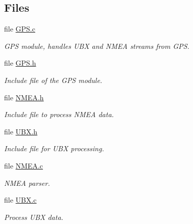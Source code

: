 \subsection*{\-Files}
\begin{DoxyCompactItemize}
\item 
file \hyperlink{_g_p_s_8c}{\-G\-P\-S.\-c}
\begin{DoxyCompactList}\small\item\em \-G\-P\-S module, handles \-U\-B\-X and \-N\-M\-E\-A streams from \-G\-P\-S. \end{DoxyCompactList}\item 
file \hyperlink{_g_p_s_8h}{\-G\-P\-S.\-h}
\begin{DoxyCompactList}\small\item\em \-Include file of the \-G\-P\-S module. \end{DoxyCompactList}\item 
file \hyperlink{_n_m_e_a_8h}{\-N\-M\-E\-A.\-h}
\begin{DoxyCompactList}\small\item\em \-Include file to process \-N\-M\-E\-A data. \end{DoxyCompactList}\item 
file \hyperlink{_u_b_x_8h}{\-U\-B\-X.\-h}
\begin{DoxyCompactList}\small\item\em \-Include file for \-U\-B\-X processing. \end{DoxyCompactList}\item 
file \hyperlink{_n_m_e_a_8c}{\-N\-M\-E\-A.\-c}
\begin{DoxyCompactList}\small\item\em \-N\-M\-E\-A parser. \end{DoxyCompactList}\item 
file \hyperlink{_u_b_x_8c}{\-U\-B\-X.\-c}
\begin{DoxyCompactList}\small\item\em \-Process \-U\-B\-X data. \end{DoxyCompactList}\end{DoxyCompactItemize}
